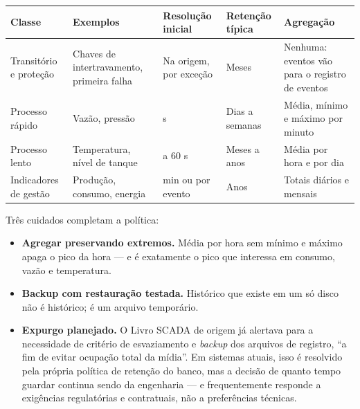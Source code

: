 \begin{longtable}[]{@{}
  >{\raggedright\arraybackslash}p{}
  >{\raggedright\arraybackslash}p{}
  >{\raggedright\arraybackslash}p{}
  >{\raggedright\arraybackslash}p{}
  >{\raggedright\arraybackslash}p{}@{}}
\toprule\noalign{}
\begin{minipage}[b]{\linewidth}\raggedright
Classe
\end{minipage} & \begin{minipage}[b]{\linewidth}\raggedright
Exemplos
\end{minipage} & \begin{minipage}[b]{\linewidth}\raggedright
Resolução inicial
\end{minipage} & \begin{minipage}[b]{\linewidth}\raggedright
Retenção típica
\end{minipage} & \begin{minipage}[b]{\linewidth}\raggedright
Agregação
\end{minipage} \\
\midrule\noalign{}
\endhead
\bottomrule\noalign{}
\endlastfoot
Transitório e proteção & Chaves de intertravamento, primeira falha & Na origem, por exceção & Meses & Nenhuma: eventos vão para o registro de eventos \\
Processo rápido & Vazão, pressão & 1 s & Dias a semanas & Média, mínimo e máximo por minuto \\
Processo lento & Temperatura, nível de tanque & 5 a 60 s & Meses a anos & Média por hora e por dia \\
Indicadores de gestão & Produção, consumo, energia & 1 min ou por evento & Anos & Totais diários e mensais \\
\end{longtable}

Três cuidados completam a política:

\begin{itemize}
\tightlist
\item
  \textbf{Agregar preservando extremos.} Média por hora sem mínimo e máximo apaga o pico da hora --- e é
  exatamente o pico que interessa em consumo, vazão e temperatura.
\item
  \textbf{Backup com restauração testada.} Histórico que existe em um só disco não é histórico; é um
  arquivo temporário.
\item
  \textbf{Expurgo planejado.} O Livro SCADA de origem já alertava para a necessidade de critério de
  esvaziamento e \emph{backup} dos arquivos de registro, ``a fim de evitar ocupação total da mídia''. Em
  sistemas atuais, isso é resolvido pela própria política de retenção do banco, mas a decisão de
  quanto tempo guardar continua sendo da engenharia --- e frequentemente responde a exigências
  regulatórias e contratuais, não a preferências técnicas.
\end{itemize}

